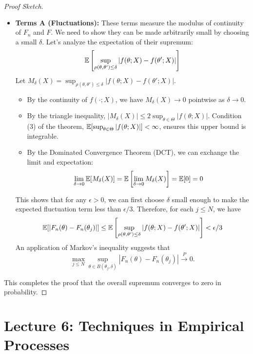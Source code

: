 \begin{proof}[Proof Sketch]
\begin{itemize}
    \item \textbf{Terms A (Fluctuations):} These terms measure the modulus of continuity of $F_n$ and $F$. We need to show they can be made arbitrarily small by choosing a small $\delta$. Let's analyze the expectation of their supremum:
    $$ \mathbb{E}\left[ \sup_{\rho(\theta, \theta') \le \delta} |f(\theta; X) - f(\theta'; X)| \right] $$
    Let $M_\delta(X) = \sup_{\rho(\theta, \theta') \le \delta} |f(\theta; X) - f(\theta'; X)|$.
    \begin{itemize}
        \item By the continuity of $f(\cdot; X)$, we have $M_\delta(X) \to 0$ pointwise as $\delta \to 0$.
        \item By the triangle inequality, $|M_\delta(X)| \le 2 \sup_{\theta \in \Theta} |f(\theta; X)|$. Condition (3) of the theorem, $\mathbb{E}[\sup_{\theta \in \Theta} |f(\theta; X)|] < \infty$, ensures this upper bound is integrable.
        \item By the Dominated Convergence Theorem (DCT), we can exchange the limit and expectation:
        $$ \lim_{\delta \to 0} \mathbb{E}[M_\delta(X)] = \mathbb{E}\left[\lim_{\delta \to 0} M_\delta(X)\right] = \mathbb{E}[0] = 0 $$
    \end{itemize}
    This shows that for any $\epsilon > 0$, we can first choose $\delta$ small enough to make the expected fluctuation term less than $\epsilon/3$. Therefore, for each $j\le N$, we have
\[
\E\brackets*{|F_n(\theta) - F_n(\theta_j)|}\le \E\left[ \sup_{\rho(\theta, \theta') \le \delta} |f(\theta; X) - f(\theta'; X)| \right]<\epsilon/3
\]
    An application of Markov's inequality suggests that
    \[
    \max_{j \le N} \sup_{\theta \in B(\theta_j, \delta)}|F_n(\theta) - F_n(\theta_j)| \xrightarrow{P} 0.
    \]
\end{itemize}
This completes the proof that the overall supremum converges to zero in probability.
\end{proof}

\section{Lecture 6: Techniques in Empirical Processes}
